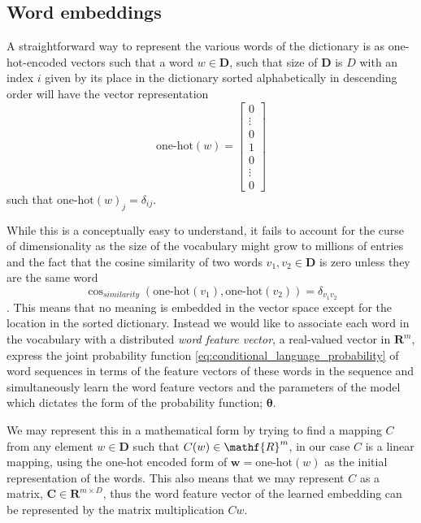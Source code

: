 \subsection{Word embeddings}
A straightforward way to represent the various words of the dictionary is as
one-hot-encoded vectors such that a word $w \in \mathbf{D}$, such that size of
$\mathbf{D}$ is $D$ with an index $i$
given by its place in the dictionary sorted alphabetically in descending order
will have the vector representation
\begin{equation}
  \label{eq:one_hot_encoding}
  \text{one-hot}(w) =
  \begin{bmatrix}
    0 \\
    \vdots \\
    0 \\
    1 \\
    0 \\
    \vdots \\
    0
  \end{bmatrix}
\end{equation}
such that $\text{one-hot}(w)_{j} = \delta_{ij}$.

While this is a conceptually easy to understand, it fails to account for the
curse of dimensionality as the size of the vocabulary might grow to millions of
entries and the fact that the cosine similarity of two words $v_1, v_2 \in
\mathbf{D}$ is zero unless they are the same word
\begin{equation}
  \label{eq:cosine_similarity}
  \cos_{similarity}(\text{one-hot}(v_1), \text{one-hot}(v_2)) = \delta_{v_1 v_2}
\end{equation}. This means that no meaning is embedded in the vector space
except for the location in the sorted dictionary. Instead we would like to
associate each word in the vocabulary with a distributed \textit{word feature
  vector}, a real-valued vector in $\mathbf{R}^m$, express the joint probability
function \ref{eq:conditional_language_probability} of word sequences in terms of
the feature vectors of these words in the sequence and simultaneously learn the
word feature vectors and the parameters of the model which dictates the form of
the probability function; $\bm{\theta}$.

We may represent this in a mathematical form by trying to find a mapping $C$
from any element $w \in \mathbf{D}$ such that $C(w) \in \mathf{R}^m$, in our
case $C$ is a linear mapping, using the one-hot encoded form of $\bm{w} =
\text{one-hot}(w)$ as the
initial representation of the words. This also means that we may represent $C$
as a matrix, $\bm{C} \in \mathbf{R}^{m \times D}$, thus the word feature vector of
the learned embedding can be represented by the matrix multiplication $Cw$.

